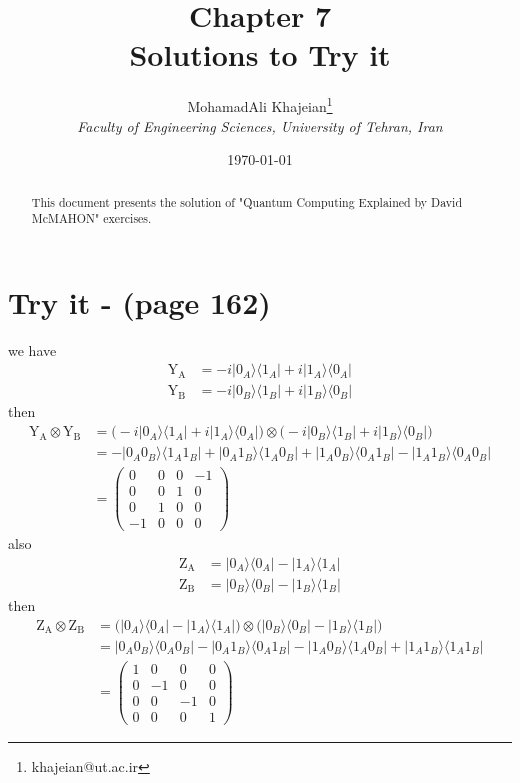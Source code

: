 \documentclass{article}
\title{\textbf{Chapter 7} \\ \small Solutions to Try it}
\author{
    MohamadAli Khajeian\footnote{khajeian@ut.ac.ir} \\ 
    \small \textit{Faculty of Engineering Sciences, University of Tehran, Iran} \\ 
}
\date{\today}
\newcommand{\op}[2]{|#1\rangle \langle#2|}
\begin{document}
\maketitle

\begin{abstract}
    This document presents the solution of "Quantum Computing Explained by David McMAHON" exercises.
\end{abstract}

\section*{Try it - (page 162)}
we have
\begin{align*}
   \text{Y}_{\text{A}} &= -i\op{0_A}{1_A} + i\op{1_A}{0_A}\\
   \text{Y}_{\text{B}} &= -i\op{0_B}{1_B} + i\op{1_B}{0_B}
\end{align*}
then
\begin{align*}
   \text{Y}_{\text{A}} \otimes \text{Y}_{\text{B}} &= \big(-i\op{0_A}{1_A} + i\op{1_A}{0_A}\big) \otimes \big(-i\op{0_B}{1_B} + i\op{1_B}{0_B}\big)\\
    &= - \op{0_A0_B}{1_A1_B} + \op{0_A1_B}{1_A0_B} + \op{1_A0_B}{0_A1_B} - \op{1_A1_B}{0_A0_B} \\
    &= \begin{pmatrix}
      0 & 0 & 0 & -1 \\
      0 & 0 & 1 & 0 \\
      0 & 1 & 0 & 0 \\
      -1 & 0 & 0 & 0
   \end{pmatrix}
\end{align*}
also
\begin{align*}
   \text{Z}_{\text{A}} &= \op{0_A}{0_A} - \op{1_A}{1_A}\\
   \text{Z}_{\text{B}} &= \op{0_B}{0_B} - \op{1_B}{1_B}
\end{align*}
then
\begin{align*}
   \text{Z}_{\text{A}} \otimes \text{Z}_{\text{B}} &= \big(\op{0_A}{0_A} - \op{1_A}{1_A}\big) \otimes \big(\op{0_B}{0_B} - \op{1_B}{1_B}\big)\\
    &= \op{0_A0_B}{0_A0_B} - \op{0_A1_B}{0_A1_B} - \op{1_A0_B}{1_A0_B} + \op{1_A1_B}{1_A1_B} \\
    &= \begin{pmatrix}
      1 & 0 & 0 & 0 \\
      0 & -1 & 0 & 0 \\
      0 & 0 & -1 & 0 \\
      0 & 0 & 0 & 1
   \end{pmatrix}
\end{align*}
\end{document}
